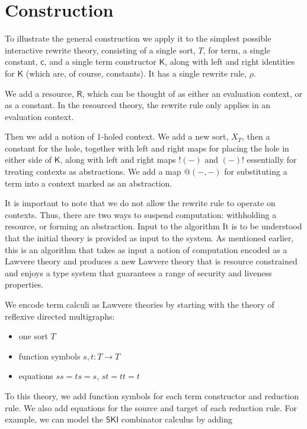 \documentclass{llncs}
\renewcommand{\:}{\colon}
\begin{document}
\section{Construction}
To illustrate the general construction we apply it to the simplest
possible interactive rewrite theory, consisting of a single sort, $T$,
for term, a single constant, $\mathsf{c}$, and a single term constructor $\mathsf{K}$, along
with left and right identities for $\mathsf{K}$ (which are, of course,
constants). It has a single rewrite rule, $\rho$.

We add a resource, $\mathsf{R}$, which can be thought of as either an evaluation
context, or as a constant. In the resourced theory, the rewrite rule
only applies in an evaluation context.

Then we add a notion of 1-holed context. We add a new sort, $X_{T}$, then a
constant for the hole, together with left and right maps for placing
the hole in either side of $\mathsf{K}$, along with left and right maps $!(-)$ and
$(-)!$ essentially for treating contexts as abstractions. We add a map
$@(-,-)$ for substituting a term into a context marked as an
abstraction.

It is important to note that we do not allow the rewrite rule to
operate on contexts. Thus, there are two ways to suspend computation:
withholding a resource, or forming an abstraction.  Input to the
algorithm It is to be understood that the initial theory is provided
as input to the system. As mentioned earlier, this is an algorithm
that takes as input a notion of computation encoded as a Lawvere
theory and produces a new Lawvere theory that is resource constrained
and enjoys a type system that guarantees a range of security and
liveness properties.

We encode term calculi as Lawvere theories by starting with the theory
of reflexive directed multigraphs:

\begin{itemize}
  \item one sort $T$
  \item function symbols $s, t: T \rightarrow T$
  \item equations $ss = ts = s$, $st = tt = t$
\end{itemize}

To this theory, we add function symbols for each term constructor and
reduction rule.  We also add equations for the source and target of
each reduction rule.  For example, we can model the $\mathsf{SKI}$ combinator
calculus by adding
\end{document}
